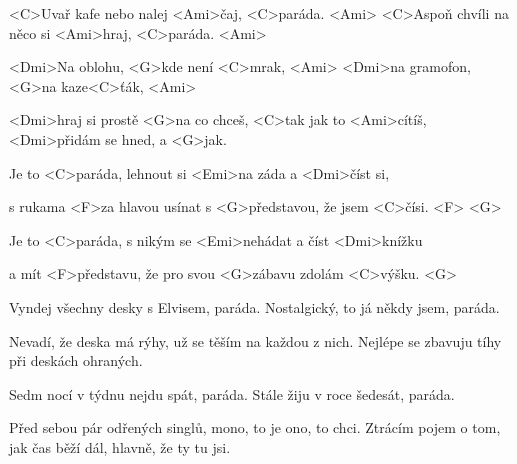 
 \zs

<C>Uvař kafe nebo nalej <Ami>čaj, <C>paráda. <Ami>
<C>Aspoň chvíli na něco si <Ami>hraj, <C>paráda. <Ami>

<Dmi>Na oblohu, <G>kde není <C>mrak, <Ami>
<Dmi>na gramofon, <G>na kaze<C>ťák, <Ami>

<Dmi>hraj si prostě <G>na co chceš, <C>tak jak to <Ami>cítíš,
<Dmi>přidám se hned, a <G>jak. 

\ks
\zr

Je to <C>paráda, lehnout si <Emi>na záda a <Dmi>číst si,

s rukama <F>za hlavou usínat s <G>představou, že jsem <C>čísi. <F> <G> 

Je to <C>paráda, s nikým se <Emi>nehádat a číst <Dmi>knížku
 
a mít <F>představu, že pro svou <G>zábavu zdolám <C>výšku. <G> 

\kr
\zs

Vyndej všechny desky s Elvisem, paráda. 
Nostalgický, to já někdy jsem, paráda.

Nevadí, že deska má rýhy, už se těším na každou z nich. 
Nejlépe se zbavuju tíhy 
při deskách ohraných. 

\ks
\zr \kr
\zs

Sedm nocí v týdnu nejdu spát, paráda. 
Stále žiju v roce šedesát, paráda. 

Před sebou pár odřených singlů, mono, to je ono, to chci. 
Ztrácím pojem o tom, jak čas běží dál, hlavně, že ty tu jsi. 

\ks
\zr \kr

\kp
